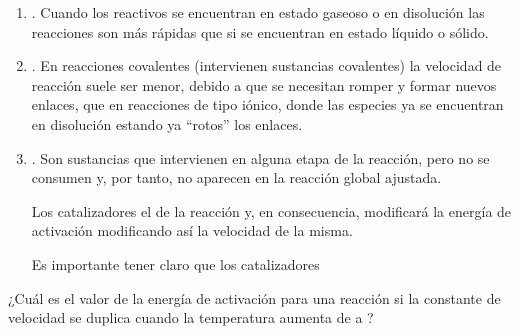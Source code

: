 \begin{enumerate}[label=\numberballmDarkTeal]
        \item {}.
        Cuando los reactivos se encuentran en estado gaseoso o en disolución las reacciones son más rápidas que si se encuentran en estado líquido o sólido.
        \item {}.
        En reacciones covalentes (intervienen sustancias covalentes) la velocidad de reacción suele ser menor, debido a que se necesitan romper y formar nuevos enlaces, que en reacciones de tipo iónico, donde las especies ya se encuentran en disolución estando ya ``rotos'' los enlaces.
        \item {}.
        Son sustancias que intervienen en alguna etapa de la reacción, pero no se consumen y, por tanto, no aparecen en la reacción global ajustada.

        Los catalizadores  el  de la reacción y, en consecuencia, modificará la energía de activación modificando así la velocidad de la misma.

        Es importante tener claro que los catalizadores 
\end{enumerate}

\begin{example}
    ¿Cuál es el valor de la energía de activación para una reacción si la constante de velocidad se duplica cuando la temperatura aumenta de  a ?
\end{example}




